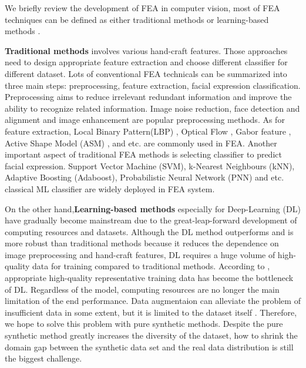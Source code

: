 We briefly review the development of FEA in computer vision, most of FEA techniques can be defined as either traditional methods or learning-based methods \citep{huangFacialExpressionRecognition2019}.

\textbf{Traditional methods} involves various hand-craft features. Those approaches need to design appropriate feature extraction and choose different classifier for different dataset. Lots of conventional FEA technicals can be summarized into three main steps: preprocessing, feature extraction, facial expression classification. Preprocessing aims to reduce irrelevant redundant information and improve the ability to recognize related information. Image noise reduction, face detection and alignment and image enhancement are popular preprocessing methods. As for feature extraction, Local Binary Pattern(LBP) \citep{ahonenFaceRecognitionLocal2004}, Optical Flow \citep{hornDeterminingOpticalFlow1981}, Gabor feature \citep{lyonsCodingFacialExpressions1998}, Active Shape Model (ASM) \citep{cootesActiveShapeModelsTheir1995}, and etc. are commonly used in FEA. Another important aspect of traditional FEA methods is selecting classifier to predict facial expression. Support Vector Machine (SVM), k-Nearest Neighbours (kNN), Adaptive Boosting (Adaboost), Probabilistic Neural Network (PNN) and etc. classical ML classifier are widely deployed in FEA system. 

On the other hand,\textbf{Learning-based methods} especially for Deep-Learning (DL) have gradually become mainstream due to the great-leap-forward development of computing resources and datasets. Although the DL method outperforms and is more robust than traditional methods because it reduces the dependence on image preprocessing and hand-craft features, DL requires a huge volume of high-quality data for training compared to traditional methods. According to \citeauthor{rohSurveyDataCollection2019}, appropriate high-quality representative training data has become the bottleneck of DL. Regardless of the model, computing resources are no longer the main limitation of the end performance. Data augmentaion can alleviate the problem of insufficient data in some extent, but it is limited to the dataset itself \citep{shortenSurveyImageData2019a}. Therefore, we hope to solve this problem with pure synthetic methods. Despite the pure synthetic method greatly increases the diversity of the dataset, how to shrink the domain gap between the synthetic data set and the real data distribution is still the biggest challenge.

